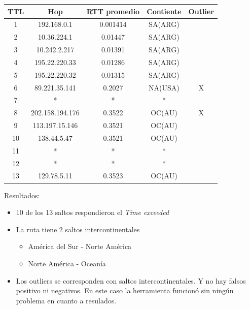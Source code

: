 \documentclass[a4paper,10pt]{article}
\begin{document}
\begin{center}
\begin{tabular}{|c | c | c || c | c |}
    \hline
    TTL & Hop & RTT promedio & Contiente & Outlier \\ \hline
1 & 192.168.0.1 & 0.001414& SA(ARG) &   \\ \hline
2 & 10.36.224.1 & 0.01447& SA(ARG) &   \\ \hline
3 & 10.242.2.217 & 0.01391& SA(ARG) &   \\ \hline
4 & 195.22.220.33 & 0.01286& SA(ARG) &   \\ \hline
5 & 195.22.220.32 & 0.01315& SA(ARG) &   \\ \hline
6 & 89.221.35.141 & 0.2027& NA(USA) & X \\ \hline
7 & * & * & * &  \\ \hline
8 & 202.158.194.176 & 0.3522& OC(AU) & X \\ \hline
9 & 113.197.15.146 & 0.3521& OC(AU) &   \\ \hline
10 & 138.44.5.47 & 0.3521& OC(AU) &   \\ \hline
11 & * & * & * &  \\ \hline
12 & * & * & * &  \\ \hline
13 & 129.78.5.11 & 0.3523& OC(AU) &   \\ \hline

\end{tabular}
\end{center}

\medskip
\medskip
\medskip

\medskip
\par{Resultados:}
\begin{itemize}
    \item  10 de los 13 saltos respondieron el \textit{Time exceeded}
    \item La ruta tiene 2 saltos intercontinentales
    \begin{itemize}
        \item América del Sur - Norte América
        \item Norte América - Oceanía
    \end{itemize}
    \item Los outliers se corresponden con saltos intercontinentales. Y no hay falsos positivo ni negativos. En este caso la herramienta funcionó sin ningún problema en cuanto a resulados.
\end{itemize}
\end{document}
